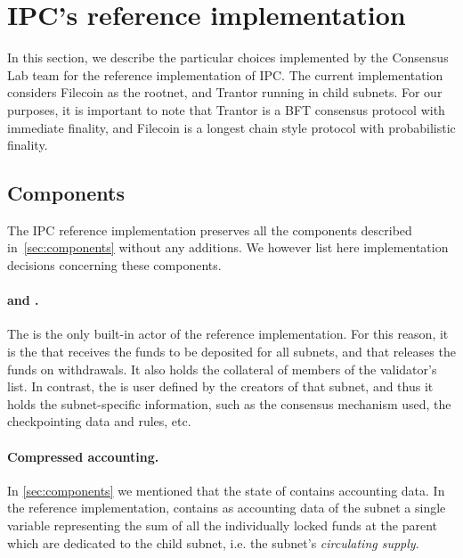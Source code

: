  \section{IPC's reference implementation}
 \label{sec:ref-impl}
 
 In this section, we describe the particular choices implemented by the Consensus Lab team for the reference implementation of IPC.  
 The current implementation considers Filecoin as the rootnet, and Trantor running in child subnets. For our purposes, it is important to note that Trantor is a BFT consensus protocol with immediate finality, and Filecoin is a longest chain style protocol with probabilistic finality. 

\subsection{Components}
The IPC reference implementation preserves all the components described in~\cref{sec:components} without any additions. We however list here implementation decisions concerning these components.

\paragraph{\gw and \sa.} The \gw is the only built-in actor of the reference implementation. For this reason, it is the \gw that receives the funds to be deposited for all subnets, and that releases the funds on withdrawals. It also holds the collateral of members of the validator's list. In contrast, the \sa is user defined by the creators of that subnet, and thus it holds the subnet-specific information, such as the consensus mechanism used, the checkpointing data and rules, etc. 

\paragraph{Compressed accounting.}
In \cref{sec:components} we mentioned that the state of \sa contains accounting data. In the reference implementation, \sa contains as accounting data of the subnet a single variable representing the sum of all the individually locked funds at the parent which are dedicated to the child subnet, i.e. the subnet's \textit{circulating supply}. 

